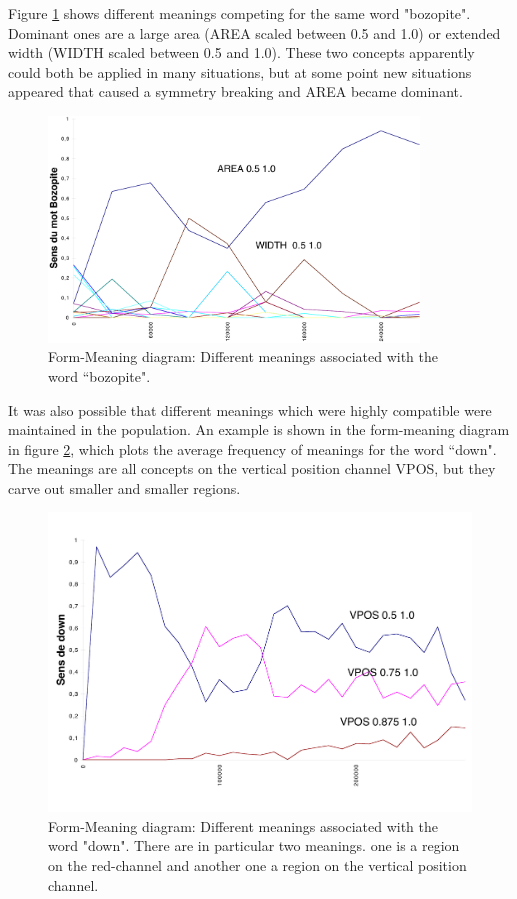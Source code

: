 {Figure \ref{fig:bozopite} shows different meanings competing for the same word "bozopite". Dominant ones are 
a large area (AREA scaled between 0.5 and 1.0) or extended width (WIDTH scaled between 0.5 and 1.0). These two concepts
apparently could both be applied in many situations, but at some point new situations appeared that 
caused a symmetry breaking and AREA became dominant. 
\begin{figure}[htbp]
  \centerline{\includegraphics[width=.70\textwidth, height=6cm]{chap8/figures/bozopite}}
\caption{\footnotesize\label{fig:bozopite} 
Form-Meaning diagram: Different meanings associated with the word ``bozopite". 
}
\end{figure}

It was also possible that different meanings which were highly compatible were maintained in the population. 
An example is shown in the form-meaning diagram in figure \ref{fig:down}, which plots the average 
frequency of meanings for the word ``down". The meanings are all concepts on the vertical position channel 
VPOS, but they carve out smaller and smaller regions. 
\begin{figure}[htbp]
  \centerline{\includegraphics[width=.65\textwidth]{chap8/figures/down}}
\caption{\footnotesize\label{fig:down} 
Form-Meaning diagram: Different meanings associated with the word "down". There are in particular two meanings. 
one is a region on the red-channel and another one a region on the vertical position channel. 
}
\end{figure}

}
